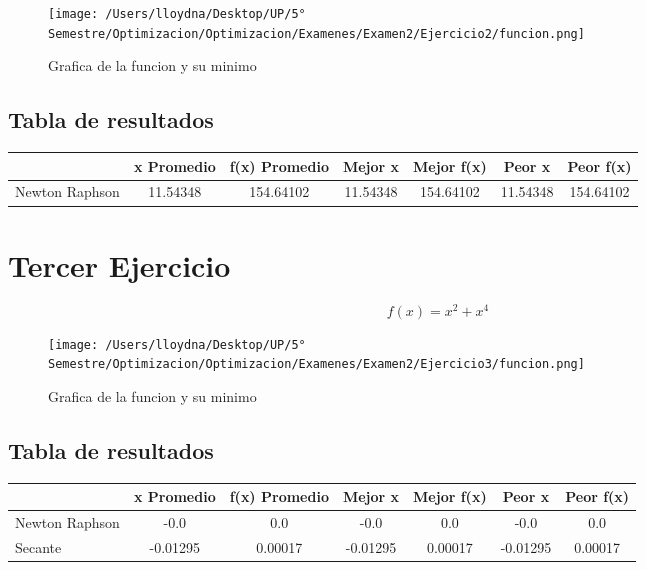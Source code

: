 \documentclass{report}
\begin{document}
            \begin{figure}[H]
                \texttt{[image: /Users/lloydna/Desktop/UP/5° Semestre/Optimizacion/Optimizacion/Examenes/Examen2/Ejercicio2/funcion.png]}
                \caption{Grafica de la funcion y su minimo}
                \label{fig:fun12}
            \end{figure}

            \subsection{Tabla de resultados}
                \begin{tabular}{l|c|c|c|c|c|c}
                    & x Promedio & f(x) Promedio & Mejor x & Mejor f(x) & Peor x & Peor f(x)\\
                    \hline
                    Newton Raphson & 11.54348 & 154.64102 & 11.54348 & 154.64102 & 11.54348 & 154.64102\\
                    \hline
                \end{tabular}
        \pagebreak

        \section{Tercer Ejercicio}
            \begin{equation*}
                f(x)=x^2+x^4
            \end{equation*}

            \begin{figure}[H]
                \texttt{[image: /Users/lloydna/Desktop/UP/5° Semestre/Optimizacion/Optimizacion/Examenes/Examen2/Ejercicio3/funcion.png]}
                \caption{Grafica de la funcion y su minimo}
                \label{fig:fun13}
            \end{figure}

            \subsection{Tabla de resultados}
                \begin{tabular}{l|c|c|c|c|c|c}
                    & x Promedio & f(x) Promedio & Mejor x & Mejor f(x) & Peor x & Peor f(x)\\
                    \hline
                    Newton Raphson & -0.0 & 0.0 & -0.0 & 0.0 & -0.0 & 0.0\\
                    \hline
                    Secante & -0.01295 & 0.00017 & -0.01295 & 0.00017 & -0.01295 & 0.00017\\
                    \hline
                \end{tabular}
        \pagebreak
\end{document}
